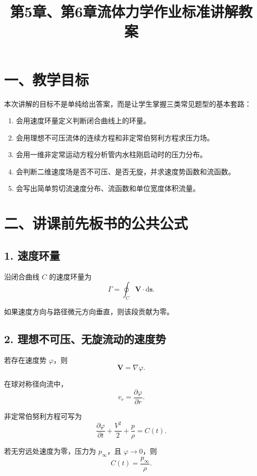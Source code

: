 \documentclass[12pt,a4paper]{ctexart}
\title{第5章、第6章流体力学作业标准讲解教案}
\author{}
\date{}
\newcommand{\dd}{\mathrm d}
\newcommand{\pinf}{p_\infty}
\newcommand{\grad}{\nabla}
\begin{document}
\maketitle

\section*{一、教学目标}

本次讲解的目标不是单纯给出答案，而是让学生掌握三类常见题型的基本套路：

\begin{enumerate}
  \item 会用速度环量定义判断闭合曲线上的环量。
  \item 会用理想不可压流体的连续方程和非定常伯努利方程求压力场。
  \item 会用一维非定常运动方程分析管内水柱刚启动时的压力分布。
  \item 会判断二维速度场是否不可压、是否无旋，并求速度势函数和流函数。
  \item 会写出简单剪切流速度分布、流函数和单位宽度体积流量。
\end{enumerate}

\section*{二、讲课前先板书的公共公式}

\subsection*{1. 速度环量}

沿闭合曲线 $C$ 的速度环量为
\[
\Gamma=\oint_C \bm V\cdot \dd \bm s .
\]

如果速度方向与路径微元方向垂直，则该段贡献为零。

\subsection*{2. 理想不可压、无旋流动的速度势}

若存在速度势 $\varphi$，则
\[
\bm V=\grad \varphi .
\]

在球对称径向流中，
\[
v_r=\frac{\partial \varphi}{\partial r}.
\]

非定常伯努利方程可写为
\[
\frac{\partial \varphi}{\partial t}
+\frac{V^2}{2}
+\frac{p}{\rho}
=C(t).
\]

若无穷远处速度为零，压力为 $\pinf$，且 $\varphi\to0$，则
\[
C(t)=\frac{\pinf}{\rho}.
\]
\end{document}
